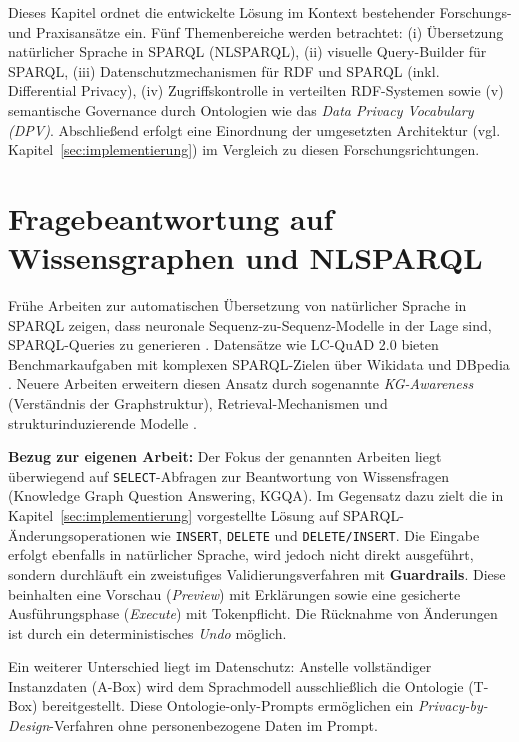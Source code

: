 Dieses Kapitel ordnet die entwickelte Lösung im Kontext bestehender Forschungs- und Praxisansätze ein. Fünf Themenbereiche werden betrachtet: (i) Übersetzung natürlicher Sprache in SPARQL (NL{\textrightarrow}SPARQL), (ii) visuelle Query-Builder für SPARQL, (iii) Datenschutzmechanismen für RDF und SPARQL (inkl. Differential Privacy), (iv) Zugriffskontrolle in verteilten RDF-Systemen sowie (v) semantische Governance durch Ontologien wie das \emph{Data Privacy Vocabulary (DPV)}. Abschließend erfolgt eine Einordnung der umgesetzten Architektur (vgl. Kapitel~\ref{sec:implementierung}) im Vergleich zu diesen Forschungsrichtungen.

\section{Fragebeantwortung auf Wissensgraphen und NL{\textrightarrow}SPARQL}

Frühe Arbeiten zur automatischen Übersetzung von natürlicher Sprache in SPARQL zeigen, dass neuronale Sequenz-zu-Sequenz-Modelle in der Lage sind, SPARQL-Queries zu generieren \cite{yin-nmt-sparql}. Datensätze wie LC-QuAD 2.0 bieten Benchmarkaufgaben mit komplexen SPARQL-Zielen über Wikidata und DBpedia \cite{dubey2019lcquad2}. Neuere Arbeiten erweitern diesen Ansatz durch sogenannte \emph{KG-Awareness} (Verständnis der Graphstruktur), Retrieval-Mechanismen und strukturinduzierende Modelle \cite{avila-kgqa-llm, pramanik-uniqorn}.

\textbf{Bezug zur eigenen Arbeit:} Der Fokus der genannten Arbeiten liegt überwiegend auf \texttt{SELECT}-Abfragen zur Beantwortung von Wissensfragen (Knowledge Graph Question Answering, KGQA). Im Gegensatz dazu zielt die in Kapitel~\ref{sec:implementierung} vorgestellte Lösung auf SPARQL-Änderungsoperationen wie \texttt{INSERT}, \texttt{DELETE} und \texttt{DELETE/INSERT}. Die Eingabe erfolgt ebenfalls in natürlicher Sprache, wird jedoch nicht direkt ausgeführt, sondern durchläuft ein zweistufiges Validierungsverfahren mit \textbf{Guardrails}. Diese beinhalten eine Vorschau (\textit{Preview}) mit Erklärungen sowie eine gesicherte Ausführungsphase (\textit{Execute}) mit Tokenpflicht. Die Rücknahme von Änderungen ist durch ein deterministisches \textit{Undo} möglich.

Ein weiterer Unterschied liegt im Datenschutz: Anstelle vollständiger Instanzdaten (A-Box) wird dem Sprachmodell ausschließlich die Ontologie (T-Box) bereitgestellt. Diese Ontologie-only-Prompts ermöglichen ein \textit{Privacy-by-Design}-Verfahren ohne personenbezogene Daten im Prompt.

